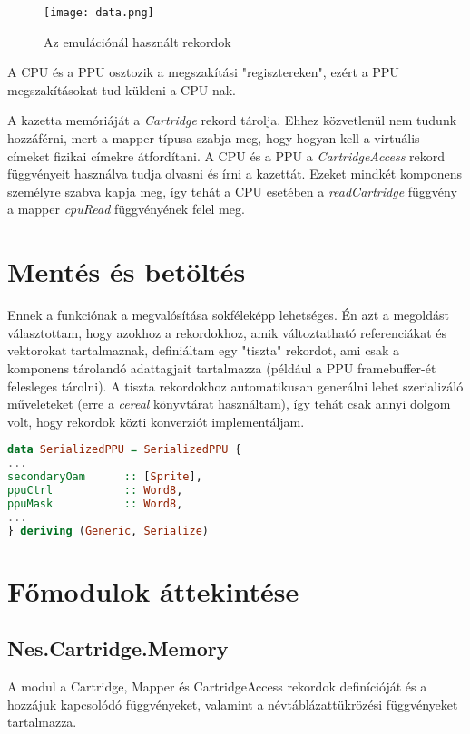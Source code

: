 \begin{figure}[H]
	\centering
	\texttt{[image: data.png]}
	\caption{Az emulációnál használt rekordok}
\end{figure}

A CPU és a PPU osztozik a megszakítási "regisztereken", ezért a PPU megszakításokat tud küldeni a CPU-nak.

A kazetta memóriáját a \emph{Cartridge} rekord tárolja. Ehhez közvetlenül nem tudunk hozzáférni, mert a mapper típusa szabja meg, hogy hogyan kell a virtuális címeket fizikai címekre átfordítani. A CPU és a PPU a \emph{CartridgeAccess} rekord függvényeit használva tudja olvasni és írni a kazettát. Ezeket mindkét komponens személyre szabva kapja meg, így tehát a CPU esetében a \emph{readCartridge} függvény a mapper \emph{cpuRead} függvényének felel meg.

\section{Mentés és betöltés}

Ennek a funkciónak a megvalósítása sokféleképp lehetséges. Én azt a megoldást választottam, hogy azokhoz a rekordokhoz, amik változtatható referenciákat és vektorokat tartalmaznak, definiáltam egy "tiszta" rekordot, ami csak a komponens tárolandó adattagjait tartalmazza (például a PPU framebuffer-ét felesleges tárolni). A tiszta rekordokhoz automatikusan generálni lehet szerializáló műveleteket (erre a \emph{cereal} könyvtárat használtam), így tehát csak annyi dolgom volt, hogy rekordok közti konverziót implementáljam.

\begin{lstlisting}[language=Haskell]
data SerializedPPU = SerializedPPU {
...
secondaryOam      :: [Sprite],
ppuCtrl           :: Word8,
ppuMask           :: Word8,
...
} deriving (Generic, Serialize)
\end{lstlisting}

\section{Főmodulok áttekintése}

\subsection{Nes.Cartridge.Memory}
A modul a Cartridge, Mapper és CartridgeAccess rekordok definícióját és a hozzájuk kapcsolódó függvényeket, valamint a névtáblázattükrözési függvényeket tartalmazza.

